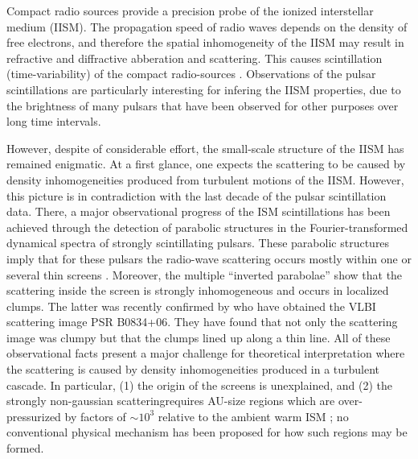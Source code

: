 \documentclass[useAMS,usenatbib]{mn2e}
\begin{document}
Compact radio sources provide a precision probe of the ionized interstellar medium
(IISM).  The propagation speed of radio waves depends on the density
of free electrons, and therefore the spatial inhomogeneity of the IISM may result in refractive and diffractive
abberation and scattering. This causes scintillation (time-variability) of the compact radio-sources
 \citep{1968Natur.218..920S,1986ApJ...301L..53B,2006ApJS..165..439R} . 
Observations of the pulsar scintillations are particularly interesting for infering the IISM properties, 
due to the brightness of many pulsars that have been observed for other purposes over long time intervals.

However, despite of considerable effort, the small-scale structure of the IISM
has remained enigmatic. At a first glance, one expects the scattering to be caused by density
inhomogeneities produced from turbulent motions of the IISM. However, this picture
is in contradiction with the last decade of the pulsar scintillation data.   There, a
major observational progress of the ISM scintillations has been
achieved through the \citet{2001ApJ...549L..97S}
detection of parabolic structures in the Fourier-transformed dynamical
spectra of strongly scintillating pulsars. These parabolic structures
imply that for these pulsars the radio-wave scattering occurs mostly
within one or several thin screens
\citep{2004MNRAS.354...43W,2006ApJ...637..346C,2008MNRAS.388.1214W}.
Moreover, the multiple ``inverted
parabolae'' \citep{2005ApJ...619L.171H} show that the scattering
inside the screen is strongly inhomogeneous and occurs in
localized clumps. The latter was recently confirmed by \cite{2010ApJ...708..232B} who have obtained the VLBI scattering
image PSR B0834+06. They
have found that not only the scattering image was clumpy but that the
clumps lined up along a thin line.
All of these
observational facts present a major challenge for theoretical
interpretation where the scattering is caused by density inhomogeneities produced in a turbulent
cascade. In particular, (1) the origin of the screens is unexplained,
and (2) the strongly non-gaussian scatteringrequires AU-size
regions which are over-pressurized by factors of $\sim 10^3$
relative to the ambient warm ISM \citep{1987Natur.328..324R}; no conventional
physical mechanism has been proposed for how such regions may be
formed.
\end{document}
